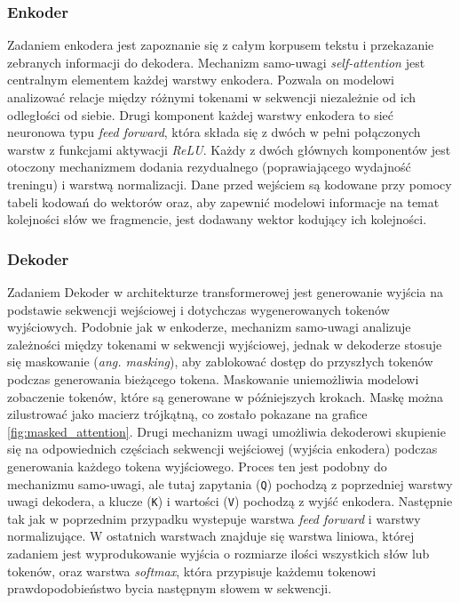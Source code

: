 \documentclass[data-science]{agh-wi} %
\begin{document}
\subsubsection*{Enkoder}
Zadaniem enkodera jest zapoznanie się z całym korpusem tekstu i przekazanie zebranych informacji do dekodera. Mechanizm samo-uwagi \textit{self-attention} jest centralnym elementem każdej warstwy enkodera. Pozwala on modelowi analizować relacje między różnymi tokenami w sekwencji niezależnie od ich odległości od siebie. Drugi komponent każdej warstwy enkodera to sieć neuronowa typu \textit{feed forward}, która składa się z dwóch w pełni połączonych warstw z funkcjami aktywacji \textit{ReLU}. Każdy z dwóch głównych komponentów jest otoczony mechanizmem dodania rezydualnego (poprawiającego wydajność treningu) i warstwą normalizacji. Dane przed wejściem są kodowane przy pomocy tabeli kodowań do wektorów oraz, aby zapewnić modelowi informacje na temat kolejności słów we fragmencie, jest dodawany wektor kodujący ich kolejności.

\subsubsection*{Dekoder}
Zadaniem Dekoder w architekturze transformerowej jest generowanie wyjścia na podstawie sekwencji wejściowej i dotychczas wygenerowanych tokenów wyjściowych. Podobnie jak w enkoderze, mechanizm samo-uwagi analizuje zależności między tokenami w sekwencji wyjściowej, jednak w dekoderze stosuje się maskowanie (\textit{ang. masking}), aby zablokować dostęp do przyszłych tokenów podczas generowania bieżącego tokena. Maskowanie uniemożliwia modelowi zobaczenie tokenów, które są generowane w późniejszych krokach. Maskę można zilustrować jako macierz trójkątną, co zostało pokazane na grafice \ref*{fig:masked_attention}. Drugi mechanizm uwagi umożliwia dekoderowi skupienie się na odpowiednich częściach sekwencji wejściowej (wyjścia enkodera) podczas generowania każdego tokena wyjściowego. Proces ten jest podobny do mechanizmu samo-uwagi, ale tutaj zapytania (\texttt{Q}) pochodzą z poprzedniej warstwy uwagi dekodera, a klucze (\texttt{K}) i wartości (\texttt{V}) pochodzą z wyjść enkodera. Następnie tak jak w poprzednim przypadku wystepuje warstwa \textit{feed forward} i warstwy normalizujące. W ostatnich warstwach znajduje się warstwa liniowa, której zadaniem jest wyprodukowanie wyjścia o rozmiarze ilości wszystkich słów lub tokenów, oraz warstwa \textit{softmax}, która przypisuje każdemu tokenowi prawdopodobieństwo bycia następnym słowem w sekwencji.
\end{document}
